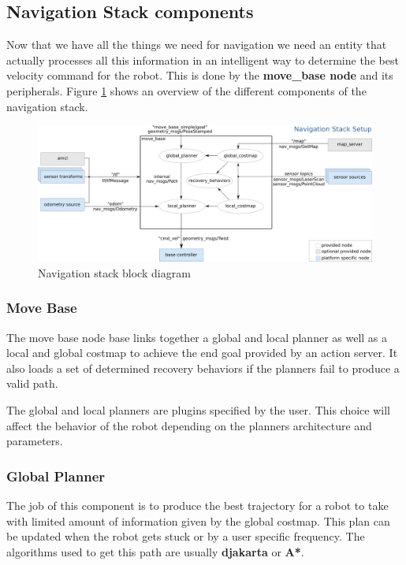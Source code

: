 \documentclass[12pt]{article}
\begin{document}
\subsection{Navigation Stack components}
Now that we have all the things we need for navigation we need an entity that actually processes all this information in an intelligent way to determine the best velocity command for the robot. This is done by the \textbf{move\_base node} and its peripherals.
Figure \ref{fig:nav_stack} shows an overview of the different components of the navigation stack.
\begin{figure}[!htb]
    \centering
    \includegraphics[width=\linewidth]{overview_tf.png}
    \caption{Navigation stack block diagram}
    \label{fig:nav_stack}
\end{figure}

\subsubsection{Move Base}

The move base node base links together a global and local planner as well as a local and global costmap to achieve the end goal provided by an action server. It also loads a set of determined recovery behaviors if the planners fail to produce a valid path. 

The global and local planners are plugins specified by the user. This choice will affect the behavior of the robot depending on the planners architecture and parameters. 

\subsubsection{Global Planner}
 
The job of this component is to produce the best trajectory for a robot to take with limited amount of information given by the global costmap.
This plan can be updated when the robot gets stuck or by a user specific frequency. The algorithms used to get this path are usually \textbf{djakarta} or \textbf{A*}.
\end{document}

